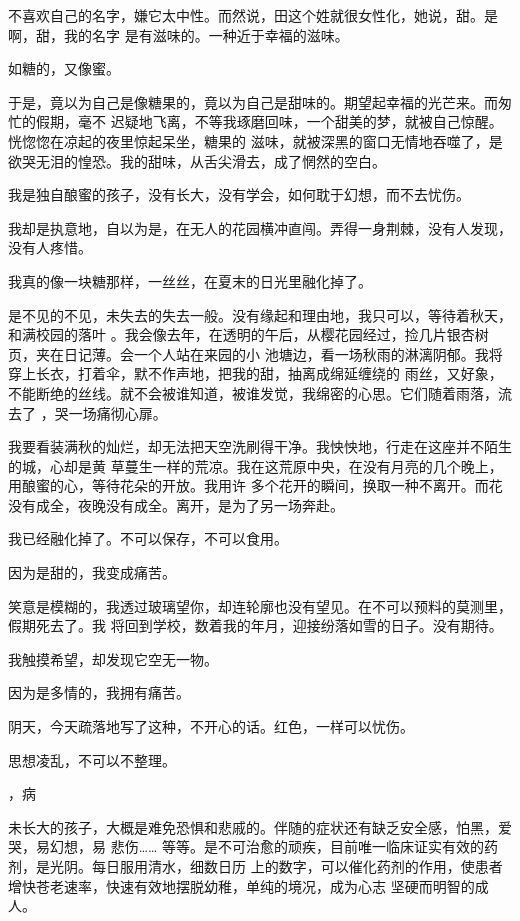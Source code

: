 \documentclass[12pt,a4paper]{article}
\newcommand{\subpart}[1]{
	\begingroup \par
	\vspace{1ex} \centering #1
	\par \endgroup \nopagebreak[4]
}
\begin{document}
		不喜欢自己的名字，嫌它太中性。而然说，田这个姓就很女性化，她说，甜。是啊，甜，我的名字
	是有滋味的。一种近于幸福的滋味。

		如糖的，又像蜜。

		于是，竟以为自己是像糖果的，竟以为自己是甜味的。期望起幸福的光芒来。而匆忙的假期，毫不
	迟疑地飞离，不等我琢磨回味，一个甜美的梦，就被自己惊醒。恍惚惚在凉起的夜里惊起呆坐，糖果的
	滋味，就被深黑的窗口无情地吞噬了，是欲哭无泪的惶恐。我的甜味，从舌尖滑去，成了惘然的空白。

		我是独自酿蜜的孩子，没有长大，没有学会，如何耽于幻想，而不去忧伤。

		我却是执意地，自以为是，在无人的花园横冲直闯。弄得一身荆棘，没有人发现，没有人疼惜。

		我真的像一块糖那样，一丝丝，在夏末的日光里融化掉了。

		是不见的不见，未失去的失去一般。没有缘起和理由地，我只可以，等待着秋天，和满校园的落叶
	。我会像去年，在透明的午后，从樱花园经过，捡几片银杏树页，夹在日记薄。会一个人站在来园的小
	池塘边，看一场秋雨的淋漓阴郁。我将穿上长衣，打着伞，默不作声地，把我的甜，抽离成绵延缠绕的
	雨丝，又好象，不能断绝的丝线。就不会被谁知道，被谁发觉，我绵密的心思。它们随着雨落，流去了
	，哭一场痛彻心扉。


		我要看装满秋的灿烂，却无法把天空洗刷得干净。我怏怏地，行走在这座并不陌生的城，心却是黄
	草蔓生一样的荒凉。我在这荒原中央，在没有月亮的几个晚上，用酿蜜的心，等待花朵的开放。我用许
	多个花开的瞬间，换取一种不离开。而花没有成全，夜晚没有成全。离开，是为了另一场奔赴。

		我已经融化掉了。不可以保存，不可以食用。

		因为是甜的，我变成痛苦。

		笑意是模糊的，我透过玻璃望你，却连轮廓也没有望见。在不可以预料的莫测里，假期死去了。我
	将回到学校，数着我的年月，迎接纷落如雪的日子。没有期待。

		我触摸希望，却发现它空无一物。

		因为是多情的，我拥有痛苦。

		阴天，今天疏落地写了这种，不开心的话。红色，一样可以忧伤。

	\endwriting



		思想凌乱，不可以不整理。

		\subpart{1，病}

		未长大的孩子，大概是难免恐惧和悲戚的。伴随的症状还有缺乏安全感，怕黑，爱哭，易幻想，易
	悲伤…… 等等。是不可治愈的顽疾，目前唯一临床证实有效的药剂，是光阴。每日服用清水，细数日历
	上的数字，可以催化药剂的作用，使患者增快苍老速率，快速有效地摆脱幼稚，单纯的境况，成为心志
	坚硬而明智的成人。
\end{document}
